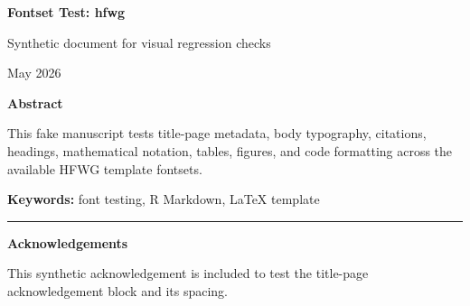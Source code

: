 \documentclass[12pt]{article}
\newif\ifhfwganon
\begin{document}
\begin{titlepage}
\thispagestyle{empty}

\vspace*{0.14\textheight}
\begin{center}


{\LARGE\bfseries Fontset Test: hfwg\par}

\vspace{0.25em}
{\large Synthetic document for visual regression checks\par}

\vspace{2em}

\begin{singlespace}
{\normalsize

\hfwgauthorblock

\par\vspace{2\baselineskip}
\hfwgseriesblock

\ifhfwganon\else
\vspace{0.5em}
{\small May 2026}\par
\fi

}
\end{singlespace}


\vspace{2em}

\begin{minipage}{0.8\textwidth}
\small\singlespacing
\textbf{Abstract}\par\vspace{0.25em}
This fake manuscript tests title-page metadata, body typography,
citations, headings, mathematical notation, tables, figures, and code
formatting across the available HFWG template fontsets.
\par\vspace{1em}
\noindent\textbf{Keywords: }font testing, R Markdown, LaTeX template
\end{minipage}

\vfill

\ifhfwganon\else
\begin{minipage}{0.8\textwidth}
\footnotesize\singlespacing
\noindent\rule{0.3\textwidth}{0.4pt}\par
\textbf{Acknowledgements}\par
This synthetic acknowledgement is included to test the title-page
acknowledgement block and its spacing.
\end{minipage}
\fi

\end{center}
\end{titlepage}
\fi\fi
\fi\fi
\end{document}
